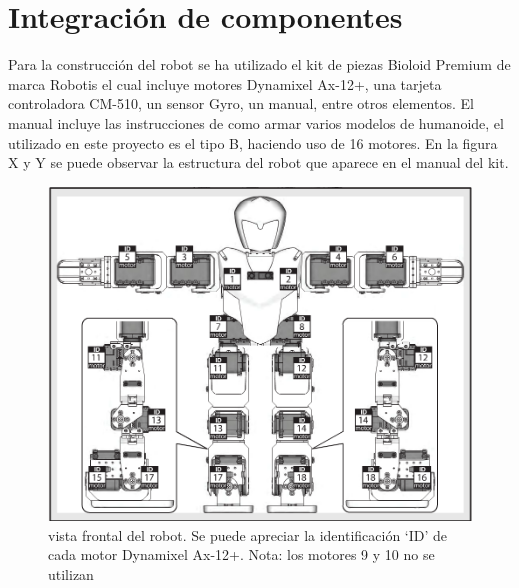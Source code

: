 \chapter{Integración de componentes}\label{chapter:Integracion_de_componentes}

Para la construcción del robot se ha utilizado el kit de piezas Bioloid Premium de marca Robotis el cual incluye motores Dynamixel Ax-12+, una tarjeta controladora CM-510, un sensor Gyro, un manual, entre otros elementos. El manual incluye las instrucciones de como armar varios modelos de humanoide, el utilizado en este proyecto es el tipo B, haciendo uso de 16 motores. En la figura X y Y se puede observar la estructura del robot que aparece en el manual del kit. 


\begin{figure}[hbtp]
\centering
\includegraphics[scale=0.3]{imagenes/Robot.png}
\caption{vista frontal del robot. Se puede apreciar la identificación ‘ID’ de cada motor Dynamixel Ax-12+. Nota: los motores 9 y 10 no se utilizan}
\end{figure}

